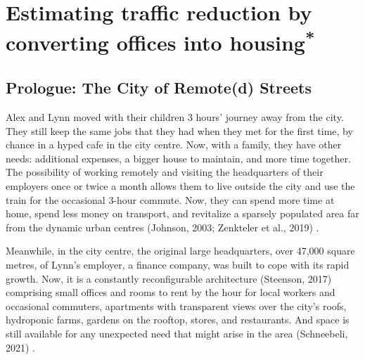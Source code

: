 \chapter{Estimating traffic reduction by converting offices into housing\textsuperscript{*}}
\label{ch:ETRCO2H}
\graphicspath{{chapters/04_ETRCO2H/figures/}}

\section*{Prologue: The City of Remote(d) Streets}




Alex and Lynn moved with their children 3 hours’ journey away from the city. They still keep the same jobs that they had when they met for the first time, by chance in a hyped cafe in the city centre. Now, with a family, they have other needs: additional expenses, a bigger house to maintain, and more time together. The possibility of working remotely and visiting the headquarters of their employers once or twice a month allows them to live outside the city and use the train for the occasional 3-hour commute. Now, they can spend more time at home, spend less money on transport, and revitalize a sparsely populated area far from the dynamic urban centres (Johnson, 2003; Zenkteler et al., 2019) \citep{Johnson2003, Zenkteler2019Home-basedResponse}.

Meanwhile, in the city centre, the original large headquarters, over 47,000 square metres, of Lynn’s employer, a finance company, was built to cope with its rapid growth. Now, it is a constantly reconfigurable architecture (Steenson, 2017) \citep{Steenson2017CedricPrice} comprising small offices and rooms to rent by the hour for local workers and occasional commuters, apartments with transparent views over the city’s roofs, hydroponic farms, gardens on the rooftop, stores, and restaurants. And space is still available for any unexpected need that might arise in the area (Schneebeli, 2021) \citep{Schneebeli2021a}. 


